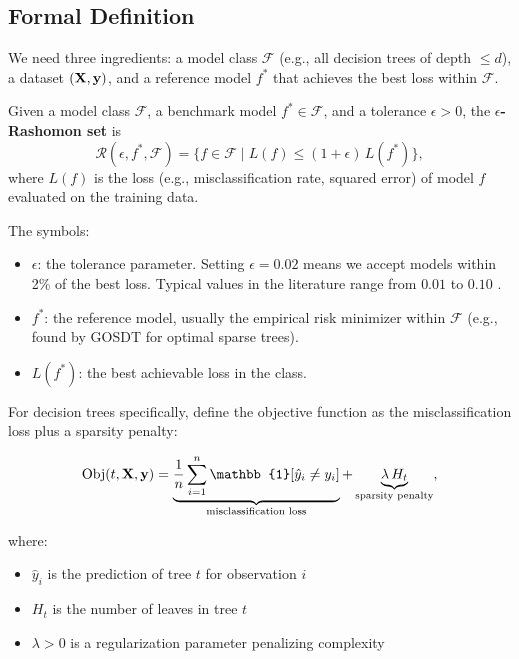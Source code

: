 \subsection{Formal Definition}

We need three ingredients: a model class $\mathcal{F}$ (e.g., all decision
trees of depth $\leq d$), a dataset $(\mathbf{X}, \mathbf{y})$, and a reference model
$f^*$ that achieves the best loss within $\mathcal{F}$.

\begin{definition}
Given a model class $\mathcal{F}$, a benchmark model $f^* \in \mathcal{F}$,
and a tolerance $\epsilon > 0$, the \textbf{$\epsilon$-Rashomon set} is
\begin{equation}\label{eq:rashomon-set}
  \mathcal{R}(\epsilon, f^*, \mathcal{F})
    = \bigl\{f \in \mathcal{F} \;\big|\;
      L(f) \leq (1 + \epsilon)\,L(f^*)\bigr\},
\end{equation}
where $L(f)$ is the loss (e.g., misclassification rate, squared error) of
model $f$ evaluated on the training data.
\end{definition}

\noindent The symbols:
\begin{itemize}[leftmargin=1.8em]
  \item $\epsilon$: the tolerance parameter.  Setting $\epsilon = 0.02$
    means we accept models within 2\% of the best loss.  Typical values
    in the literature range from $0.01$ to $0.10$ \citep{XinEtAl2022}.
  \item $f^*$: the reference model, usually the empirical risk minimizer
    within $\mathcal{F}$ (e.g., found by GOSDT for optimal sparse trees).
  \item $L(f^*)$: the best achievable loss in the class.
\end{itemize}

For decision trees specifically, \citet{XinEtAl2022} define the objective
function as the misclassification loss plus a sparsity penalty:

\begin{equation}\label{eq:tree-objective}
  \operatorname{Obj}(t, \bX, \by) =
    \underbrace{\frac{1}{n}\sum_{i=1}^{n} \mathbb{1}[\hat{y}_i \neq y_i]}_{\text{misclassification loss}}
    + \underbrace{\lambda \, H_t}_{\text{sparsity penalty}},
\end{equation}

\noindent where:
\begin{itemize}[leftmargin=1.8em]
  \item $\hat{y}_i$ is the prediction of tree $t$ for observation $i$
  \item $H_t$ is the number of leaves in tree $t$
  \item $\lambda > 0$ is a regularization parameter penalizing complexity
\end{itemize}

